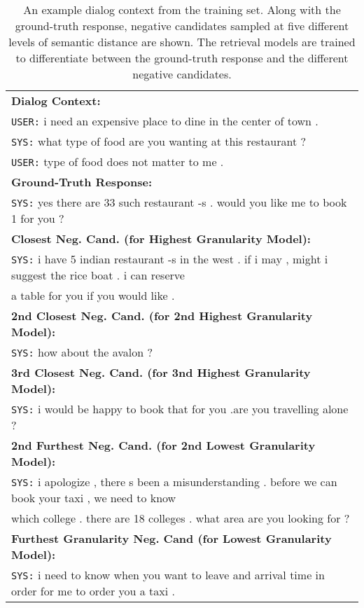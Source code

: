 \documentclass[11pt,a4paper]{article}
\begin{document}
\begin{table*}[]
    \centering
    \begin{tabular}{l}
    \hline \hline
\textbf{Dialog Context:}\\
\texttt{USER:} i need an expensive place to dine in the center of town . \\
\texttt{SYS:} what type of food are you wanting at this restaurant ?  \\
\texttt{USER:} type of food does not matter to me . \\
\hline
\textbf{Ground-Truth Response:} \\
\texttt{SYS:} yes there are 33 such restaurant -s . would  you like me to book 1 for you ? \\
\hline
\textbf{Closest Neg. Cand. (for Highest Granularity Model):} \\
\texttt{SYS:} i have 5 indian restaurant -s in the west . if i may , might i suggest the rice boat . i can reserve\\ a table for you if you would like . \\
\hline
\textbf{2nd Closest Neg. Cand. (for 2nd Highest Granularity Model):} \\
\texttt{SYS:} how about the avalon ? \\
\hline
\textbf{3rd Closest Neg. Cand. (for 3nd Highest Granularity Model):} \\
\texttt{SYS:} i would be happy to book that for you .are you travelling alone ? \\
\hline
\textbf{2nd Furthest Neg. Cand. (for 2nd Lowest Granularity Model):} \\
\texttt{SYS:} i apologize , there s been a misunderstanding . before we can book your taxi , we need to know \\which college . there are 18 colleges . what area are you looking for ? \\\hline
\textbf{Furthest Granularity Neg. Cand (for Lowest Granularity Model):} \\
\texttt{SYS:} i need to know when you want to leave and  arrival time in order for me to order you a taxi . \\

\hline 

\hline \hline
\end{tabular}
\caption{An example dialog context from the training set. Along with the ground-truth response, negative candidates sampled at five different levels of semantic distance are shown. The retrieval models are trained to differentiate between the ground-truth response and the different negative candidates.}
\label{mwoz_example}
\end{table*}
\end{document}
